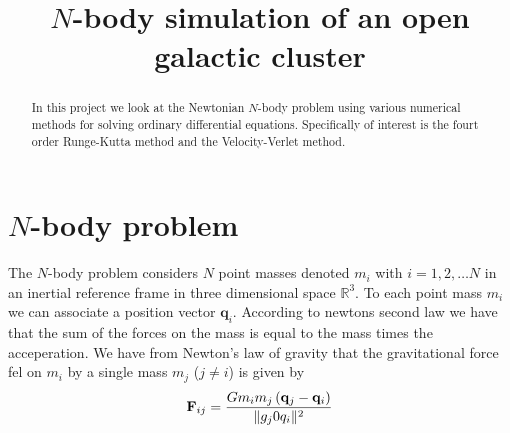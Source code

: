 \documentclass[a4paper, 11pt]{article}
\title{$N$-body simulation of an open galactic cluster}
\begin{document}
\maketitle
\begin{abstract}
    In this project we look at the Newtonian $N$-body problem using various
    numerical methods for solving ordinary differential equations. Specifically
    of interest is the fourt order Runge-Kutta method and the Velocity-Verlet
    method.
\end{abstract}

\section{$N$-body problem}
\label{sec:_n_body_problem}

The $N$-body problem considers $N$ point masses denoted $m_i$ with $i = 1, 2,
\ldots N$ in an inertial reference frame in three dimensional space
$\mathbb{R}^3$. To each point mass $m_i$ we can associate a position vector
$\mathbf{q}_i$.  According to newtons second law we have that the sum of the
forces on the mass is equal to the mass times the acceperation. We have from Newton's law of gravity that the gravitational force fel on $m_i$ by a single mass $m_j$ ($j \neq i$) is given by
\begin{equation}
    \notag
    \mathbf{F}_{ij} = \frac{Gm_im_j \left( \mathbf{q}_j - \mathbf{q}_i \right)}{\|g_j 0 q_i\|_{}^2}
\end{equation}
\end{document}
